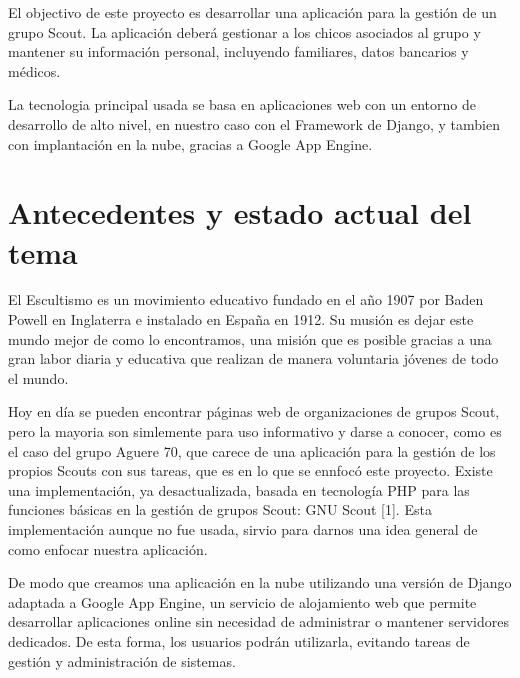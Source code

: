El objectivo de este proyecto es desarrollar una aplicación para la gestión de un grupo
 Scout. La aplicación deberá gestionar a los chicos asociados al grupo y mantener su 
información personal, incluyendo familiares, datos bancarios y médicos. 

La tecnologia principal usada se basa en aplicaciones web con un entorno de desarrollo de alto
nivel, en nuestro caso con el Framework de Django, y tambien con implantación en la nube, gracias a 
Google App Engine.
\section{Antecedentes y estado actual del tema}
\label{1:sec:1}
El Escultismo es un movimiento educativo fundado en el año 1907 por Baden Powell en Inglaterra
e instalado en España en 1912. Su musión es dejar este mundo mejor de como lo encontramos,
una misión que es posible gracias a una gran labor diaria y educativa que realizan de manera
voluntaria jóvenes de todo el mundo.

Hoy en día se pueden encontrar páginas web de organizaciones de grupos Scout,  pero la mayoria
son simlemente para uso informativo y darse a conocer, como es el caso del grupo Aguere 70, que carece de
una aplicación para la gestión de los propios Scouts con sus tareas, que es en lo que se ennfocó este proyecto. Existe
una implementación, ya desactualizada, basada en tecnología PHP para las funciones básicas en la gestión de grupos
Scout: GNU Scout [1]. Esta implementación aunque no fue usada, sirvio para darnos una idea general
de como enfocar nuestra aplicación.

De modo que creamos una aplicación en la nube utilizando una versión de Django adaptada a Google 
App Engine, un servicio de alojamiento web que permite desarrollar aplicaciones online sin 
necesidad de administrar o mantener servidores dedicados. De esta forma, los usuarios podrán utilizarla, evitando 
tareas de gestión y administración de sistemas.


